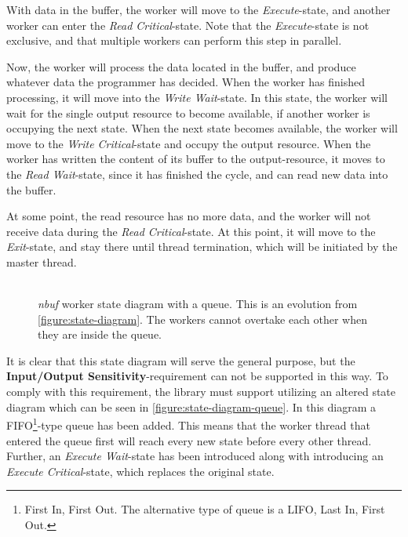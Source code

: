 \documentclass[a4paper]{article}
\newcommand{\nbuf}{\textit{nbuf} }
\begin{document}
With data in the buffer, the worker will move to the \textit{Execute}-state, and another worker can enter the \textit{Read Critical}-state. Note that the \textit{Execute}-state is not exclusive, and that multiple workers can perform this step in parallel. 

Now, the worker will process the data located in the buffer, and produce whatever data the programmer has decided. When the worker has finished processing, it will move into the \textit{Write Wait}-state. In this state, the worker will wait for the single output resource to become available, if another worker is occupying the next state. When the next state becomes available, the worker will move to the \textit{Write Critical}-state and occupy the output resource. When the worker has written the content of its buffer to the output-resource, it moves to the \textit{Read Wait}-state, since it has finished the cycle, and can read new data into the buffer. 

At some point, the read resource has no more data, and the worker will not receive data during the \textit{Read Critical}-state. At this point, it will move to the \textit{Exit}-state, and stay there until thread termination, which will be initiated by the master thread.\\\\

\begin{figure}
	\begin{adjustwidth}{-0.5in}{-0.5in}
    \centering
    \def\svgwidth{\columnwidth}
    
  	\caption{\nbuf worker state diagram with a queue. This is an evolution from \autoref{figure:state-diagram}. The workers cannot overtake each other when they are inside the queue.}
	\label{figure:state-diagram-queue}
	\end{adjustwidth}
\end{figure}

It is clear that this state diagram will serve the general purpose, but the \textbf{Input/Output Sensitivity}-requirement can not be supported in this way. To comply with this requirement, the library must support utilizing an altered state diagram which can be seen in \autoref{figure:state-diagram-queue}. In this diagram a FIFO\footnote{First In, First Out. The alternative type of queue is a LIFO, Last In, First Out.}-type queue has been added. This means that the worker thread that entered the queue first will reach every new state before every other thread. Further, an \textit{Execute Wait}-state has been introduced along with introducing an \textit{Execute Critical}-state, which replaces the original state.\\
\end{document}

